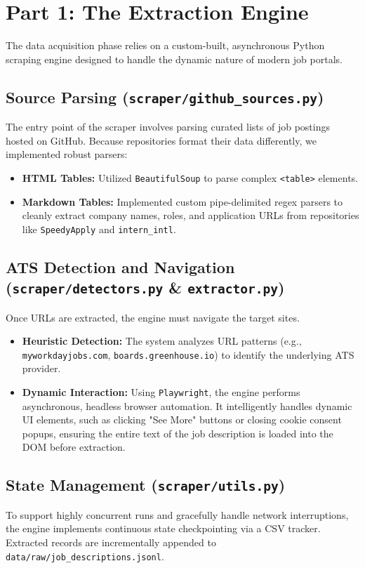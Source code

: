 \documentclass[11pt, a4paper]{article}
\begin{document}
\newpage
\section{Part 1: The Extraction Engine}

The data acquisition phase relies on a custom-built, asynchronous Python scraping engine designed to handle the dynamic nature of modern job portals.

\subsection{Source Parsing (\texttt{scraper/github\_sources.py})}
The entry point of the scraper involves parsing curated lists of job postings hosted on GitHub. Because repositories format their data differently, we implemented robust parsers:
\begin{itemize}
    \item \textbf{HTML Tables:} Utilized \texttt{BeautifulSoup} to parse complex \texttt{<table>} elements.
    \item \textbf{Markdown Tables:} Implemented custom pipe-delimited regex parsers to cleanly extract company names, roles, and application URLs from repositories like \texttt{SpeedyApply} and \texttt{intern\_intl}.
\end{itemize}

\subsection{ATS Detection and Navigation (\texttt{scraper/detectors.py} \& \texttt{extractor.py})}
Once URLs are extracted, the engine must navigate the target sites. 
\begin{itemize}
    \item \textbf{Heuristic Detection:} The system analyzes URL patterns (e.g., \texttt{myworkdayjobs.com}, \texttt{boards.greenhouse.io}) to identify the underlying ATS provider.
    \item \textbf{Dynamic Interaction:} Using \texttt{Playwright}, the engine performs asynchronous, headless browser automation. It intelligently handles dynamic UI elements, such as clicking "See More" buttons or closing cookie consent popups, ensuring the entire text of the job description is loaded into the DOM before extraction.
\end{itemize}

\subsection{State Management (\texttt{scraper/utils.py})}
To support highly concurrent runs and gracefully handle network interruptions, the engine implements continuous state checkpointing via a CSV tracker. Extracted records are incrementally appended to \texttt{data/raw/job\_descriptions.jsonl}.
\end{document}
